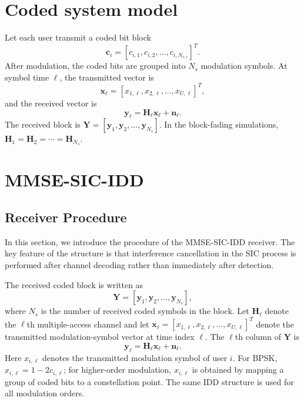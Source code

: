 \section{Coded system model}

Let each user transmit a coded bit block
\begin{equation}
    \bm{c}_i=[c_{i,1},c_{i,2},\ldots,c_{i,N_{c,i}}]^T .
\end{equation}
After modulation, the coded bits are grouped into $N_s$ modulation symbols. At symbol time $\ell$, the transmitted vector is
\begin{equation}
    \bm{x}_\ell=[x_{1,\ell},x_{2,\ell},\ldots,x_{U,\ell}]^T,
\end{equation}
and the received vector is
\begin{equation}
    \bm{y}_\ell=\bm{H}_\ell\bm{x}_\ell+\bm{n}_\ell.
    \label{eq:coded-symbol-model}
\end{equation}
The received block is $\bm{Y}=[\bm{y}_1,\bm{y}_2,\ldots,\bm{y}_{N_s}]$. In the block-fading simulations, $\bm{H}_1=\bm{H}_2=\cdots=\bm{H}_{N_s}$.

\section{MMSE-SIC-IDD}


\subsection{Receiver Procedure}

In this section, we introduce the procedure of the MMSE-SIC-IDD receiver. The key feature of the structure is that interference cancellation in the SIC process is performed after channel decoding rather than immediately after detection.

The received coded block is written as
\begin{equation}
    \bm{Y}
    =
    [\bm{y}_1,\bm{y}_2,\ldots,\bm{y}_{N_s}],
\end{equation}
where $N_s$ is the number of received coded symbols in the block. Let $\bm{H}_\ell$ denote the $\ell$th multiple-access channel and let $\bm{x}_\ell=[x_{1,\ell},x_{2,\ell},\ldots,x_{U,\ell}]^T$ denote the transmitted modulation-symbol vector at time index $\ell$. The $\ell$th column of $\bm{Y}$ is
\begin{equation}
    \bm{y}_\ell
    =
    \bm{H}_\ell\bm{x}_\ell+\bm{n}_\ell .
\end{equation}
Here $x_{i,\ell}$ denotes the transmitted modulation symbol of user $i$. For BPSK, $x_{i,\ell}=1-2c_{i,\ell}$; for higher-order modulation, $x_{i,\ell}$ is obtained by mapping a group of coded bits to a constellation point. The same IDD structure is used for all modulation orders.

